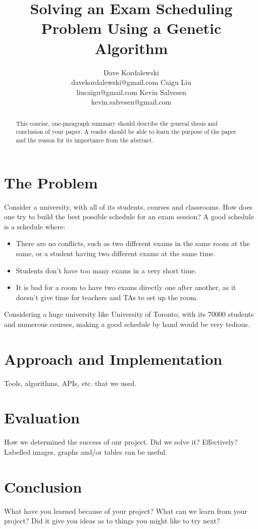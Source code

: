 \documentclass[letterpaper]{article}
\title{Solving an Exam Scheduling Problem Using a Genetic Algorithm}
\author{Dave Kordalewski \\ davekordalewski@gmail.com
   \And Caigu Liu \\liucaigu@gmail.com
   \And Kevin Salvesen \\ kevin.salvesen@gmail.com}
\begin{document}
\maketitle

\begin{abstract}
  This concise, one-paragraph summary should describe the general thesis
  and conclusion of your paper. A reader should be able to learn the purpose
  of the paper and the reason for its importance from the abstract.
\end{abstract}

\section{The Problem}
  Consider a university, with all of its students, courses and classrooms. 
  How does one try to build the best possible schedule for an exam session? 
  A good schedule is a schedule where:
  \begin{itemize}
  \item  There are no conflicts, such as two different exams in the same room
         at the same, or a student having two different exams at the same time.
  \item  Students don't have too many exams in a very short time.
  \item  It is bad for a room to have two exams directly one after another,
         as it doesn't give time for teachers and TAs to set up the room.
  \end{itemize}

 Considering a huge university like University of Toronto, with its 70000 students
 and numerous courses, making a good schedule by hand would be very tedious. 

\section{Approach and Implementation}
  Tools, algorithms, APIs, etc. that we used.

\section{Evaluation}
  How we determined the success of our project. Did we solve it? Effectively?
  Labelled images, graphs and/or tables can be useful.
  
\section{Conclusion}
  What have you learned because of your project? What can we learn from your
  project? Did it give you ideas as to things you might like to try next?

% 
% 
\end{document}
